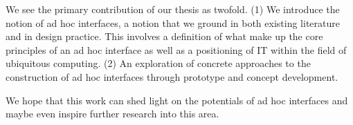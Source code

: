 We see the primary contribution of our thesis as twofold.
(1) We introduce the notion of ad hoc interfaces, a notion that we ground in both existing literature and in design practice. 
This involves a definition of what make up the core principles of an ad hoc interface as well as a positioning of IT within the field of ubiquitous computing. 
(2) An exploration of concrete approaches to the construction of ad hoc interfaces through prototype and concept development.

We hope that this work can shed light on the potentials of ad hoc interfaces and maybe even inspire further research into this area.